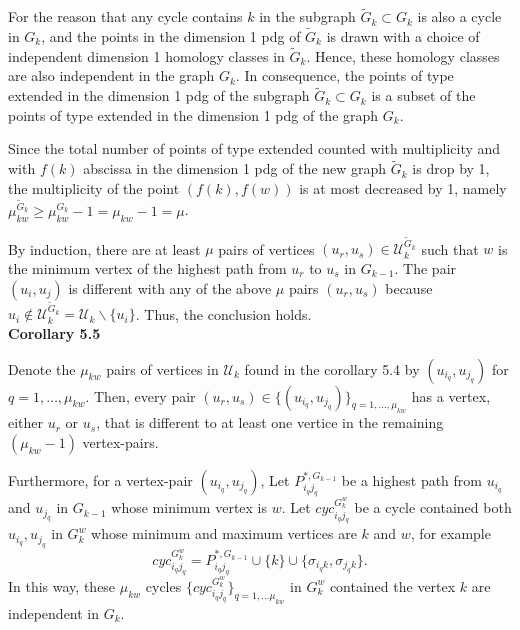 \documentclass[a4paper,12pt]{article}
\numberwithin{equation}{section}
\begin{document}
	For the reason that any cycle contains $k$ in the subgraph $\tilde{G}_k \subset G_k$ is also a cycle in $G_k$, and the points in the dimension 1 pdg of $\tilde{G}_k$ is drawn with a choice of independent dimension 1 homology classes in $\tilde{G}_k$. Hence, these homology classes are also independent in the graph $G_k$. In consequence, the points of type extended in the dimension 1 pdg of the subgraph $\tilde{G}_k \subset G_k$ is a subset of the points of type extended in the dimension 1 pdg of the graph $G_k$.
	
	Since the total number of points of type extended counted with multiplicity and with $f(k)$ abscissa in the dimension 1 pdg of the new graph $\tilde{G}_k$ is drop by 1, the multiplicity of the point $(f(k),f(w))$ is at most decreased by 1, namely $\mu_{kw}^{\tilde{G}_k} \geq \mu_{kw}^{G_k} -1 = \mu_{kw} -1 = \mu$.
	
	By induction, there are at least $\mu$ pairs of vertices $(u_r, u_s) \in \mathcal{U}^{\tilde{G}_k}_k$ such that $w$ is the minimum vertex of the highest path from $u_r$ to $u_s$ in $G_{k-1}$. The pair $(u_i,u_j)$ is different with any of the above $\mu$ pairs $(u_r,u_s)$ because $u_i \notin \mathcal{U}^{\tilde{G}_k}_k = \mathcal{U}_k \backslash \{u_i\}$. Thus, the conclusion holds.\\


	
	\noindent \textbf{Corollary 5.5}
	
	Denote the $\mu_{kw}$ pairs of vertices in $\mathcal{U}_k$ found in the corollary 5.4 by $(u_{i_q}, u_{j_q})$ for $q = 1,\ldots, \mu_{kw}$. Then, every pair $(u_r, u_s) \in \{(u_{i_q}, u_{j_q})\}_{q = 1,\ldots, \mu_{kw}}$ has a vertex, either $u_r$ or $u_s$, that is different to at least one vertice in the remaining $(\mu_{kw}-1)$ vertex-pairs.
	
	Furthermore, for a vertex-pair $(u_{i_q},u_{j_q})$, Let $P_{i_q j_q}^{*,G_{k-1}}$ be a highest path from $u_{i_q}$ and $u_{j_q}$ in $G_{k-1}$ whose minimum vertex is $w$. Let $cyc_{i_q j_q}^{G^w_k}$ be a cycle contained both $u_{i_q}, u_{j_q}$ in $G_k^w$ whose minimum and maximum vertices are $k$ and $w$, for example
	$$cyc_{i_q j_q}^{G^w_k} = P_{i_q j_q}^{*,G_{k-1}} \cup \{k \} \cup \{\sigma_{i_q k}, \sigma_{j_q k} \}.$$ 
	In this way, these $\mu_{kw}$ cycles $\{cyc_{i_q j_q}^{G^w_k}\}_{q=1,\ldots \mu_{kw}}$ in $G_k^w$ contained the vertex $k$ are independent in $G_k$.\\
	
\end{document}
